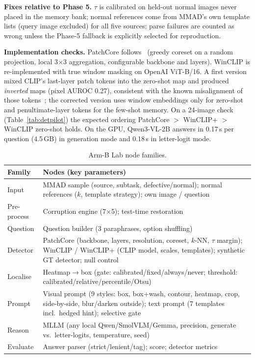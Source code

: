 \documentclass[conference]{IEEEtran}
\begin{document}
\textbf{Fixes relative to Phase 5.} $\tau$ is calibrated on held-out normal images
never placed in the memory bank; normal references come from MMAD's own template
lists (query image excluded) for all five sources; parse failures are counted as
wrong unless the Phase-5 fallback is explicitly selected for reproduction.

\textbf{Implementation checks.} PatchCore follows~\cite{roth2022patchcore} (greedy
coreset on a random projection, local 3$\times$3 aggregation, configurable backbone
and layers). WinCLIP is re-implemented with true window masking on OpenAI
ViT-B/16. A first version mixed CLIP's last-layer patch tokens into the zero-shot map
and produced \emph{inverted} maps (pixel AUROC 0.27), consistent with the known
misalignment of those tokens~\cite{li2023clipsurgery}; the corrected version uses
window embeddings only for zero-shot and penultimate-layer tokens for the few-shot
memory. On a 24-image check (Table~\ref{tab:detpilot}) the expected ordering
PatchCore $>$ WinCLIP+ $>$ WinCLIP zero-shot holds. On the GPU, Qwen3-VL-2B answers
in 0.17\,s per question (4.5\,GB) in generation mode and 0.18\,s in letter-logit mode.

\begin{table}[t]
\centering
\caption{Arm-B Lab node families.}
\label{tab:nodes}
\footnotesize
\begin{tabular}{@{}p{1.5cm}p{6.5cm}@{}}
\toprule
Family & Nodes (key parameters) \\
\midrule
Input & MMAD sample (source, subtask, defective/normal); normal references ($k$, template strategy); own image / question \\
Pre-process & Corruption engine (7$\times$5); test-time restoration \\
Question & Question builder (3 paraphrases, option shuffling) \\
Detector & PatchCore (backbone, layers, resolution, coreset, $k$-NN, $\tau$ margin); WinCLIP / WinCLIP+ (CLIP model, scales, templates); synthetic GT detector; null control \\
Localise & Heatmap$\rightarrow$box (gate: calibrated/fixed/always/never; threshold: calibrated/relative/percentile/Otsu) \\
Prompt & Visual prompt (9 styles: box, box+wash, contour, heatmap, crop, side-by-side, blur/darken outside); text prompt (7 templates incl.\ hedged hint); selective gate \\
Reason & MLLM (any local Qwen/SmolVLM/Gemma, precision, generate vs.\ letter-logits, temperature, seed) \\
Evaluate & Answer parser (strict/lenient/tag); score; detector metrics \\
\bottomrule
\end{tabular}
\end{table}
\end{document}
